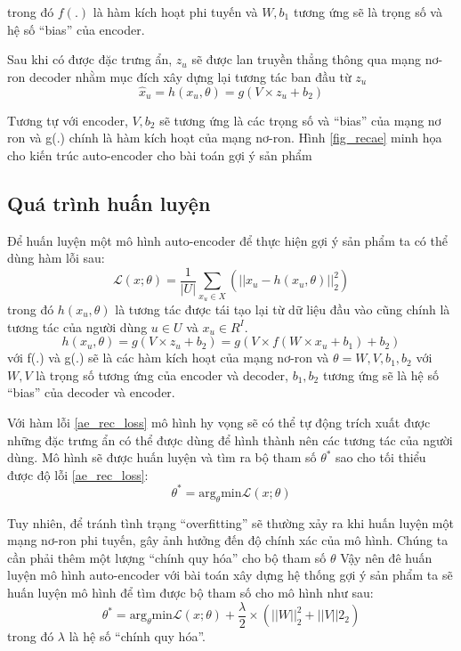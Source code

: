   
    trong đó $f(.)$ là hàm kích hoạt phi tuyến và $W,b_1$ tương ứng sẽ là trọng số và hệ số ``bias'' của encoder. 

    Sau khi có được đặc trưng ẩn, $z_u$ sẽ được lan truyền thẳng thông qua mạng nơ-ron decoder nhằm mục đích xây dựng lại tương tác ban đầu từ $z_u$
    \begin{equation}
        \widehat{x}_u = h(x_u,\theta) = g(V \times z_u + b_2)
    \end{equation}

    Tương tự với encoder, $V,b_2$ sẽ tương ứng là các trọng số và ``bias'' của mạng nơ ron và g(.) chính là hàm kích hoạt của mạng nơ-ron.
    Hình \ref{fig_recae} minh họa cho kiến trúc auto-encoder cho bài toán gợi ý sản phẩm
    
    \subsection{Quá trình huấn luyện}
    
    Để huấn luyện một mô hình auto-encoder để thực hiện gợi ý sản phẩm ta có thể dùng hàm lỗi sau:
    \begin{equation}
        \label{ae_rec_loss}
        \mathcal{L}(x;\theta) = \frac {1}{|U|}\sum_{x_u \in X}(||x_u - h(x_u,\theta)||^2_2)
    \end{equation}
    trong đó $h(x_u,\theta)$ là tương tác được tái tạo lại từ dữ liệu đầu vào cũng chính là tương tác của người dùng $u \in U$ và $x_u \in R^I$.
    \begin{equation}
        h(x_u,\theta) = g(V \times z_u + b_2) = g(V \times f(W \times x_u + b_1) + b_2)
    \end{equation}    
    với f(.) và g(.) sẽ là các hàm kích hoạt của mạng nơ-ron và $\theta = {W, V, b_1, b_2}$ với $W,V$ là trọng số tương ứng của encoder và decoder, $b_1,b_2$ tương ứng sẽ là hệ số ``bias'' của decoder và encoder.
    
    Với hàm lỗi \ref{ae_rec_loss} mô hình hy vọng sẽ có thể tự động trích xuất được những đặc trưng ẩn có thể được dùng để hình thành nên các tương tác của người dùng.
    Mô hình sẽ được huấn luyện và tìm ra bộ tham số $\theta^*$ sao cho tối thiểu được độ lỗi \ref{ae_rec_loss}: 
    \begin{equation}
        \theta^* = \text{arg}_\theta \text{min}  \mathcal{L}(x;\theta)
    \end{equation}    
    

    Tuy nhiên, để tránh tình trạng ``overfitting'' sẽ thường xảy ra khi huấn luyện một mạng nơ-ron phi tuyến, gây ảnh hưởng đến độ chính xác của mô hình. 
    Chúng ta cần phải thêm một lượng ``chính quy hóa'' cho bộ tham số $\theta$   
    Vậy nên đê huấn luyện mô hình auto-encoder với bài toán xây dựng hệ thống gợi ý sản phẩm ta sẽ huấn luyện mô hình để tìm được bộ tham số cho mô hình  như sau:
    \begin{equation}
        \label{ae_rec_obj}
        \theta^* = \text{arg}_\theta \text{min}  \mathcal{L}(x;\theta)  + \frac \lambda 2 \times (||W||^2_2 + ||V||2_2)
    \end{equation}
    trong đó $\lambda$ là hệ số ``chính quy hóa''.

